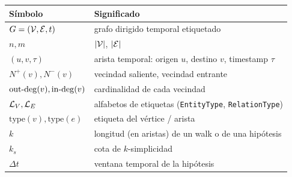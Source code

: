 \begin{center}
\renewcommand{\arraystretch}{1.2}
\begin{tabular}{p{3.0cm}p{9.5cm}}
\toprule
\textbf{Símbolo} & \textbf{Significado} \\
\midrule
\(G = (\mathcal{V}, \mathcal{E}, t)\) & grafo dirigido temporal etiquetado \\
\(n, m\) & \(|\mathcal{V}|\), \(|\mathcal{E}|\) \\
\((u, v, \tau)\) & arista temporal: origen \(u\), destino \(v\), timestamp \(\tau\) \\
\(N^{+}(v), N^{-}(v)\) & vecindad saliente, vecindad entrante \\
\(\mathrm{out\text{-}deg}(v), \mathrm{in\text{-}deg}(v)\) & cardinalidad de cada vecindad \\
\(\mathcal{L}_V, \mathcal{L}_E\) & alfabetos de etiquetas (\texttt{EntityType}, \texttt{RelationType}) \\
\(\mathrm{type}(v), \mathrm{type}(e)\) & etiqueta del vértice / arista \\
\(k\) & longitud (en aristas) de un walk o de una hipótesis \\
\(k_s\) & cota de \(k\)-simplicidad \\
\(\Delta t\) & ventana temporal de la hipótesis \\
\bottomrule
\end{tabular}
\end{center}

